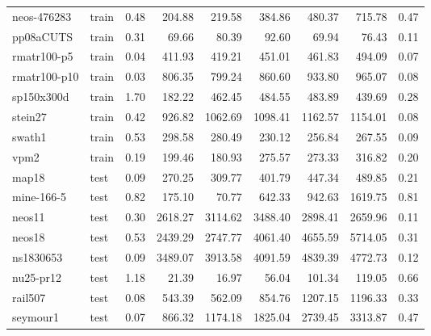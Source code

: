 \documentclass[letterpaper]{article} %
\begin{document}
\begin{table*}[t]
\begin{footnotesize}
\begin{tabular}{ll|r|rrrrr|r}
        neos-476283 &  train &             0.48 &   204.88 &   219.58 &   384.86 &   480.37 &   715.78 &             0.47 \\
          pp08aCUTS &  train &             0.31 &    69.66 &    80.39 &    92.60 &    69.94 &    76.43 &             0.11 \\
        rmatr100-p5 &  train &             0.04 &   411.93 &   419.21 &   451.01 &   461.83 &   494.09 &             0.07 \\
       rmatr100-p10 &  train &             0.03 &   806.35 &   799.24 &   860.60 &   933.80 &   965.07 &             0.08 \\
         sp150x300d &  train &             1.70 &   182.22 &   462.45 &   484.55 &   483.89 &   439.69 &             0.28 \\
            stein27 &  train &             0.42 &   926.82 &  1062.69 &  1098.41 &  1162.57 &  1154.01 &             0.08 \\
             swath1 &  train &             0.53 &   298.58 &   280.49 &   230.12 &   256.84 &   267.55 &             0.09 \\
               vpm2 &  train &             0.19 &   199.46 &   180.93 &   275.57 &   273.33 &   316.82 &             0.20 \\
\midrule
              map18 &   test &             0.09 &   270.25 &   309.77 &   401.79 &   447.34 &   489.85 &             0.21 \\
         mine-166-5 &   test &             0.82 &   175.10 &    70.77 &   642.33 &   942.63 &  1619.75 &             0.81 \\
             neos11 &   test &             0.30 &  2618.27 &  3114.62 &  3488.40 &  2898.41 &  2659.96 &             0.11 \\
             neos18 &   test &             0.53 &  2439.29 &  2747.77 &  4061.40 &  4655.59 &  5714.05 &             0.31 \\
          ns1830653 &   test &             0.09 &  3489.07 &  3913.58 &  4091.59 &  4839.39 &  4772.73 &             0.12 \\
          nu25-pr12 &   test &             1.18 &    21.39 &    16.97 &    56.04 &   101.34 &   119.05 &             0.66 \\
            rail507 &   test &             0.08 &   543.39 &   562.09 &   854.76 &  1207.15 &  1196.33 &             0.33 \\
           seymour1 &   test &             0.07 &   866.32 &  1174.18 &  1825.04 &  2739.45 &  3313.87 &             0.47 \\
\bottomrule
\end{tabular}
\end{footnotesize}
\end{table*}
\end{document}
